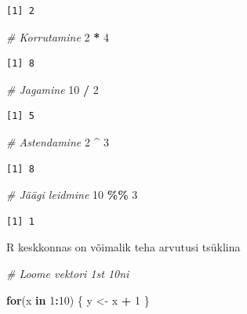 \documentclass[
]{book}
\newenvironment{Shaded}{\begin{snugshade}}{\end{snugshade}}
\newcommand{\CommentTok}[1]{\textcolor[rgb]{0.56,0.35,0.01}{\textit{#1}}}
\newcommand{\ControlFlowTok}[1]{\textcolor[rgb]{0.13,0.29,0.53}{\textbf{#1}}}
\newcommand{\DecValTok}[1]{\textcolor[rgb]{0.00,0.00,0.81}{#1}}
\newcommand{\NormalTok}[1]{#1}
\newcommand{\OtherTok}[1]{\textcolor[rgb]{0.56,0.35,0.01}{#1}}
\newcommand{\SpecialCharTok}[1]{\textcolor[rgb]{0.81,0.36,0.00}{\textbf{#1}}}
\renewenvironment{Shaded} {\begin{snugshade}\footnotesize} {\end{snugshade}}
\begin{document}
\begin{verbatim}
[1] 2
\end{verbatim}

\begin{Shaded}
\begin{Highlighting}[]
\CommentTok{\# Korrutamine}
\DecValTok{2} \SpecialCharTok{*} \DecValTok{4}
\end{Highlighting}
\end{Shaded}

\begin{verbatim}
[1] 8
\end{verbatim}

\begin{Shaded}
\begin{Highlighting}[]
\CommentTok{\# Jagamine}
\DecValTok{10} \SpecialCharTok{/} \DecValTok{2}
\end{Highlighting}
\end{Shaded}

\begin{verbatim}
[1] 5
\end{verbatim}

\begin{Shaded}
\begin{Highlighting}[]
\CommentTok{\# Astendamine}
\DecValTok{2} \SpecialCharTok{\^{}} \DecValTok{3}
\end{Highlighting}
\end{Shaded}

\begin{verbatim}
[1] 8
\end{verbatim}

\begin{Shaded}
\begin{Highlighting}[]
\CommentTok{\# Jäägi leidmine}
\DecValTok{10} \SpecialCharTok{\%\%} \DecValTok{3}
\end{Highlighting}
\end{Shaded}

\begin{verbatim}
[1] 1
\end{verbatim}

R keskkonnas on võimalik teha arvutusi tsüklina

\begin{Shaded}
\begin{Highlighting}[]
\CommentTok{\# Loome vektori 1st 10ni}

\ControlFlowTok{for}\NormalTok{(x }\ControlFlowTok{in} \DecValTok{1}\SpecialCharTok{:}\DecValTok{10}\NormalTok{)}
\NormalTok{\{}
\NormalTok{  y }\OtherTok{\textless{}{-}}\NormalTok{ x }\SpecialCharTok{+} \DecValTok{1}
\NormalTok{\}}
\end{Highlighting}
\end{Shaded}
\end{document}
